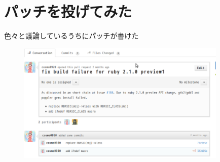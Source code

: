 \section{パッチを投げてみた}

\begin{frame}
\begin{center}
{\Huge
色々と議論しているうちにパッチが書けた
}
\end{center}
\end{frame}

\begin{frame}
\begin{figure}
\begin{center}
  \includegraphics[width=10cm]{img/pull181.png}
\end{center}
\end{figure}
\end{frame}
